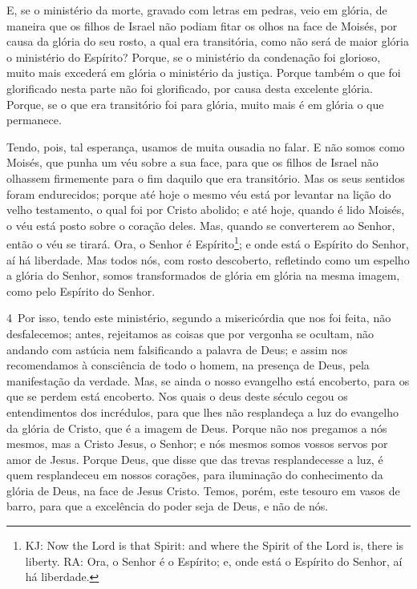 E, se o ministério da morte, gravado com letras em pedras, veio em
glória, de maneira que os filhos de Israel não podiam fitar os olhos
na face de Moisés, por causa da glória do seu rosto, a qual era
transitória, como não será de maior glória o ministério do
Espírito? Porque, se o ministério da condenação foi glorioso,
muito mais excederá em glória o ministério da justiça. Porque
também o que foi glorificado nesta parte não foi glorificado, por
causa desta excelente glória. Porque, se o que era
transitório foi para glória, muito mais é em glória o que permanece.

Tendo, pois, tal esperança, usamos de muita ousadia no falar.
E não somos como Moisés, que punha um véu sobre a sua face,
para que os filhos de Israel não olhassem firmemente para o fim
daquilo que era transitório. Mas os seus sentidos foram
endurecidos; porque até hoje o mesmo véu está por levantar na lição
do velho testamento, o qual foi por Cristo abolido; e até
hoje, quando é lido Moisés, o véu está posto sobre o coração deles.
Mas, quando se converterem ao Senhor, então o véu se tirará.
Ora, o Senhor é Espírito\footnote{KJ: Now the Lord is that
Spirit: and where the Spirit of the Lord is, there is liberty. RA:
 Ora, o Senhor é o Espírito; e, onde está o Espírito do Senhor, aí há
liberdade.}; e onde está o Espírito do Senhor, aí há liberdade.
Mas todos nós, com rosto descoberto, refletindo como um
espelho a glória do Senhor, somos transformados de glória em glória
na mesma imagem, como pelo Espírito do Senhor.

\medskip

\lettrine{4}\ Por isso, tendo este ministério, segundo a
misericórdia que nos foi feita, não desfalecemos; antes,
rejeitamos as coisas que por vergonha se ocultam, não andando com
astúcia nem falsificando a palavra de Deus; e assim nos recomendamos
à consciência de todo o homem, na presença de Deus, pela
manifestação da verdade. Mas, se ainda o nosso evangelho está
encoberto, para os que se perdem está encoberto. Nos quais o
deus deste século cegou os entendimentos dos incrédulos, para que
lhes não resplandeça a luz do evangelho da glória de Cristo, que é a
imagem de Deus. Porque não nos pregamos a nós mesmos, mas a
Cristo Jesus, o Senhor; e nós mesmos somos vossos servos por amor de
Jesus. Porque Deus, que disse que das trevas resplandecesse a
luz, é quem resplandeceu em nossos corações, para iluminação do
conhecimento da glória de Deus, na face de Jesus Cristo. Temos,
porém, este tesouro em vasos de barro, para que a excelência do
poder seja de Deus, e não de nós.

